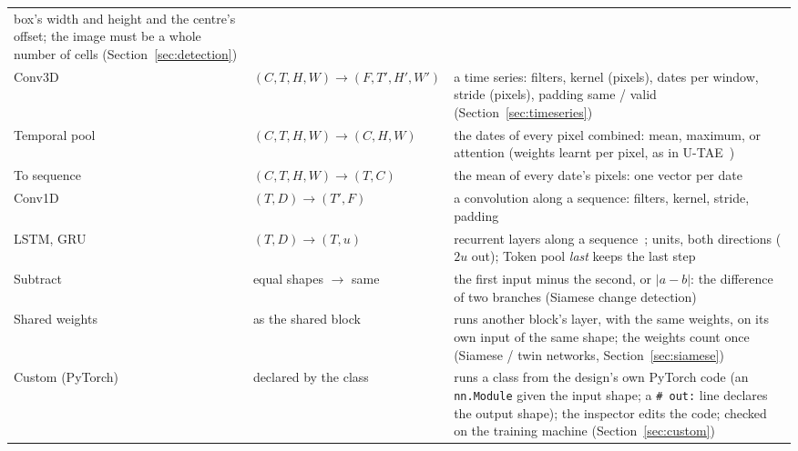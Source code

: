 \documentclass[11pt,a4paper]{article}
\begin{document}
\begin{longtable}{@{}p{2.9cm}p{3.7cm}p{8.4cm}@{}}
box's width and height and the centre's offset; the image must be a whole number of cells (Section~\ref{sec:detection})\\
Conv3D & $(C,T,H,W)\rightarrow(F,T',H',W')$ & a time series: filters, kernel (pixels), dates per window, stride (pixels), padding same
/ valid (Section~\ref{sec:timeseries})\\
Temporal pool & $(C,T,H,W)\rightarrow(C,H,W)$ & the dates of every pixel combined: mean, maximum, or attention (weights learnt per
pixel, as in U-TAE~\cite{garnot2021utae})\\
To sequence & $(C,T,H,W)\rightarrow(T,C)$ & the mean of every date's pixels: one vector per date\\
Conv1D & $(T,D)\rightarrow(T',F)$ & a convolution along a sequence: filters, kernel, stride, padding\\
LSTM, GRU & $(T,D)\rightarrow(T,u)$ & recurrent layers along a sequence~\cite{hochreiter1997lstm}; units, both directions ($2u$ out); Token pool
\emph{last} keeps the last step\\
Subtract & equal shapes $\rightarrow$ same & the first input minus the second, or $|a-b|$: the difference of two branches (Siamese
change detection)\\
Shared weights & as the shared block & runs another block's layer, with the same weights, on its own input of the same shape; the weights
count once (Siamese / twin networks, Section~\ref{sec:siamese})\\
Custom (PyTorch) & declared by the class & runs a class from the design's own PyTorch code (an \texttt{nn.Module} given the input
shape; a \texttt{\# out:} line declares the output shape); the inspector edits the code; checked on the training machine
(Section~\ref{sec:custom})\\
\bottomrule
\end{longtable}
\end{document}
